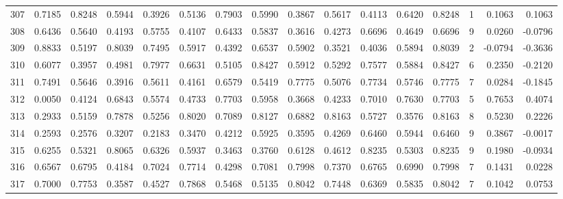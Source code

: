 \begin{tabular}{lrrrrrrrrrrrrrrr}
307 &      0.7185 &  0.8248 &  0.5944 &  0.3926 &  0.5136 &  0.7903 &  0.5990 &  0.3867 &  0.5617 &  0.4113 &   0.6420 &     0.8248 &      1 &                    0.1063 &                     0.1063 \\
308 &      0.6436 &  0.5640 &  0.4193 &  0.5755 &  0.4107 &  0.6433 &  0.5837 &  0.3616 &  0.4273 &  0.6696 &   0.4649 &     0.6696 &      9 &                    0.0260 &                    -0.0796 \\
309 &      0.8833 &  0.5197 &  0.8039 &  0.7495 &  0.5917 &  0.4392 &  0.6537 &  0.5902 &  0.3521 &  0.4036 &   0.5894 &     0.8039 &      2 &                   -0.0794 &                    -0.3636 \\
310 &      0.6077 &  0.3957 &  0.4981 &  0.7977 &  0.6631 &  0.5105 &  0.8427 &  0.5912 &  0.5292 &  0.7577 &   0.5884 &     0.8427 &      6 &                    0.2350 &                    -0.2120 \\
311 &      0.7491 &  0.5646 &  0.3916 &  0.5611 &  0.4161 &  0.6579 &  0.5419 &  0.7775 &  0.5076 &  0.7734 &   0.5746 &     0.7775 &      7 &                    0.0284 &                    -0.1845 \\
312 &      0.0050 &  0.4124 &  0.6843 &  0.5574 &  0.4733 &  0.7703 &  0.5958 &  0.3668 &  0.4233 &  0.7010 &   0.7630 &     0.7703 &      5 &                    0.7653 &                     0.4074 \\
313 &      0.2933 &  0.5159 &  0.7878 &  0.5256 &  0.8020 &  0.7089 &  0.8127 &  0.6882 &  0.8163 &  0.5727 &   0.3576 &     0.8163 &      8 &                    0.5230 &                     0.2226 \\
314 &      0.2593 &  0.2576 &  0.3207 &  0.2183 &  0.3470 &  0.4212 &  0.5925 &  0.3595 &  0.4269 &  0.6460 &   0.5944 &     0.6460 &      9 &                    0.3867 &                    -0.0017 \\
315 &      0.6255 &  0.5321 &  0.8065 &  0.6326 &  0.5937 &  0.3463 &  0.3760 &  0.6128 &  0.4612 &  0.8235 &   0.5303 &     0.8235 &      9 &                    0.1980 &                    -0.0934 \\
316 &      0.6567 &  0.6795 &  0.4184 &  0.7024 &  0.7714 &  0.4298 &  0.7081 &  0.7998 &  0.7370 &  0.6765 &   0.6990 &     0.7998 &      7 &                    0.1431 &                     0.0228 \\
317 &      0.7000 &  0.7753 &  0.3587 &  0.4527 &  0.7868 &  0.5468 &  0.5135 &  0.8042 &  0.7448 &  0.6369 &   0.5835 &     0.8042 &      7 &                    0.1042 &                     0.0753 \\

\end{tabular}
